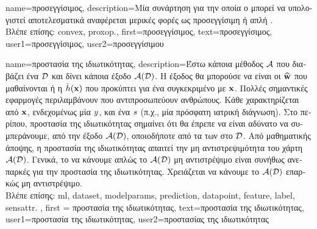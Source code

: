 {name={\foreignlanguage{greek}{προσεγγίσιμος}},
	description={\foreignlanguage{greek}{Μία} 
		 \foreignlanguage{greek}{συνάρτηση για την οποία ο}  
		\foreignlanguage{greek}{μπορεί να υπολογιστεί αποτελεσματικά αναφέρεται μερικές φορές ως 
		προσεγγίσιμη ή απλή} \cite{Condat2013}.\\
	\foreignlanguage{greek}{Βλέπε επίσης:} \gls{convex}, \gls{proxop}.},
	first={\foreignlanguage{greek}{προσεγγίσιμος}},
	text={\foreignlanguage{greek}{προσεγγίσιμος}},
	user1={\foreignlanguage{greek}{προσεγγίσιμος}}, %
	user2={\foreignlanguage{greek}{προσεγγίσιμου}} %
}

{name={\foreignlanguage{greek}{προστασία της ιδιωτικότητας}},
     description={\foreignlanguage{greek}{Έστω κάποια μέθοδος}  $\mathcal{A}$ 
        \foreignlanguage{greek}{που διαβάζει ένα} 
	 $\mathcal{D}$ \foreignlanguage{greek}{και δίνει κάποια έξοδο $\mathcal{A}(\mathcal{D})$. Η έξοδος 
	θα μπορούσε να είναι οι}  $\widehat{{\bf w}}$ \foreignlanguage{greek}{που μαθαίνονται ή η}  
	$\hat{h}({\bf x})$ \foreignlanguage{greek}{που προκύπτει για ένα συγκεκριμένο}  \foreignlanguage{greek}{με} 
	 ${\bf x}$. \foreignlanguage{greek}{Πολλές σημαντικές εφαρμογές}  
	\foreignlanguage{greek}{περιλαμβάνουν}  \foreignlanguage{greek}{που αντιπροσωπεύουν ανθρώπους. Κάθε} 
	 \foreignlanguage{greek}{χαρακτηρίζεται από}  ${\bf x}$, 
	\foreignlanguage{greek}{ενδεχομένως μία}  $y$, \foreignlanguage{greek}{και ένα}  $s$ 
	\foreignlanguage{greek}{(π.χ., μία πρόσφατη ιατρική διάγνωση). 
	Στο περίπου, προστασία της ιδιωτικότητας σημαίνει ότι θα έπρεπε να είναι αδύνατο να συμπεράνουμε, από την έξοδο $\mathcal{A}(\mathcal{D})$, 
	οποιοδήποτε από τα}  \foreignlanguage{greek}{των}  \foreignlanguage{greek}{στο} $\mathcal{D}$. 
	\foreignlanguage{greek}{Από μαθηματικής άποψης, η προστασία της ιδιωτικότητας απαιτεί την μη αντιστρεψιμότητα του χάρτη  
	$\mathcal{A}(\mathcal{D})$. Γενικά, το να κάνουμε απλώς το $\mathcal{A}(\mathcal{D})$ μη αντιστρέψιμο 
	είναι συνήθως ανεπαρκές για την προστασία της ιδιωτικότητας. Χρειάζεται να κάνουμε το $\mathcal{A}(\mathcal{D})$ επαρκώς μη αντιστρέψιμο.}\\
	\foreignlanguage{greek}{Βλέπε επίσης:} \gls{ml}, \gls{dataset}, \gls{modelparams}, \gls{prediction}, \gls{datapoint}, \gls{feature}, \gls{label}, \gls{sensattr}.
	}, 
	first = {\foreignlanguage{greek}{προστασία της ιδιωτικότητας}}, 
	text={\foreignlanguage{greek}{προστασία της ιδιωτικότητας}},
	user1={\foreignlanguage{greek}{προστασία της ιδιωτικότητας}}, %
   	user2={\foreignlanguage{greek}{προστασίας της ιδιωτικότητας}} %
}

